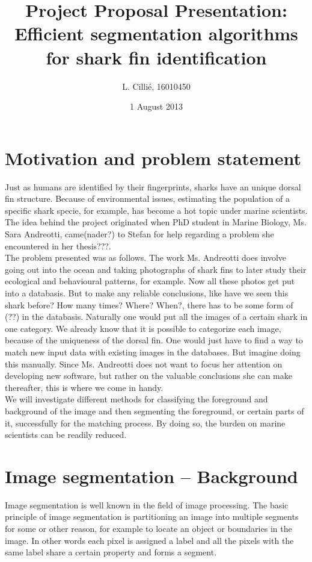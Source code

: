 \documentclass[a4paper,10pt]{article}
\title{Project Proposal Presentation: Efficient segmentation algorithms for
shark fin identification}
\author{L. Cilli\'{e}, 16010450}
\date{1 August 2013}
\begin{document}
\maketitle
\section{Motivation and problem statement}
Just as humans are identified by their fingerprints, sharks have an unique
dorsal fin structure.  Because of environmental issues, estimating the
population of a specific shark specie, for example, has become a hot topic under
marine scientists.  The idea behind the project originated when PhD
student in Marine Biology, Ms. Sara Andreotti, came(nader?) to Stefan for help
regarding a problem she encountered in her thesis???. \\ 

The problem presented was
as follows.  The work Ms. Andreotti does involve going out into the ocean and
taking photographs of shark fins to later study their ecological and behavioural
patterns, for example.  Now all these photos get put into a databasis. But to
make any reliable conclusions, like have we seen this shark before?  How many
times? Where? When?, there has to be some form of (??) in the databasis. 
Naturally one would put all the images of a certain shark in one category.  We
already know that it is possible to categorize each image, because of the
uniqueness of the dorsal fin.  One would just have to find a way to match new
input data with existing images in the databases.  But imagine doing this
manually.  Since Ms. Andreotti does not want to focus her attention on
developing new software, but rather on the valuable conclusions she can make
thereafter, this is where we come in handy. \\

We will investigate different
methods for classifying the foreground and background of the image
and then segmenting the foreground, or certain parts of it, successfully for the
matching process.  By doing so, the burden on marine scientists can be readily 
reduced.


\section{Image segmentation -- Background}
Image segmentation is well known in the field of image processing.  The basic
principle of image segmentation is partitioning an image into multiple segments
for some or other reason, for example to locate an object or boundaries in the
image.  In other words each pixel is assigned a label and all the pixels with
the same label share a certain property and forms a segment.  \\
\end{document}
